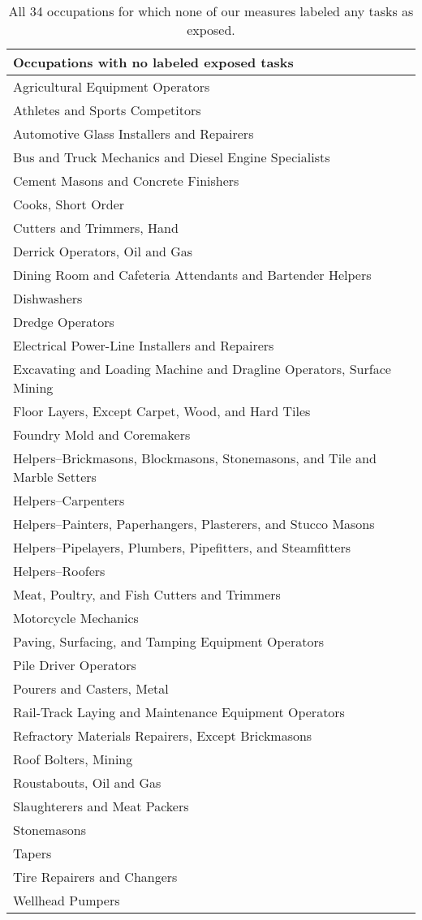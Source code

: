 \begin{table}[H]
\centering
\begin{tabular}{@{}l@{}}
\toprule
\textbf{Occupations with no labeled exposed tasks} \\
\midrule
Agricultural Equipment Operators \\
Athletes and Sports Competitors \\
Automotive Glass Installers and Repairers \\
Bus and Truck Mechanics and Diesel Engine Specialists \\
Cement Masons and Concrete Finishers \\
Cooks, Short Order \\
Cutters and Trimmers, Hand \\
Derrick Operators, Oil and Gas \\
Dining Room and Cafeteria Attendants and Bartender Helpers \\
Dishwashers \\
Dredge Operators \\
Electrical Power-Line Installers and Repairers \\
Excavating and Loading Machine and Dragline Operators, Surface Mining \\
Floor Layers, Except Carpet, Wood, and Hard Tiles \\
Foundry Mold and Coremakers \\
Helpers--Brickmasons, Blockmasons, Stonemasons, and Tile and Marble Setters \\
Helpers--Carpenters \\
Helpers--Painters, Paperhangers, Plasterers, and Stucco Masons \\
Helpers--Pipelayers, Plumbers, Pipefitters, and Steamfitters \\
Helpers--Roofers \\
Meat, Poultry, and Fish Cutters and Trimmers \\
Motorcycle Mechanics \\
Paving, Surfacing, and Tamping Equipment Operators \\
Pile Driver Operators \\
Pourers and Casters, Metal \\
Rail-Track Laying and Maintenance Equipment Operators \\
Refractory Materials Repairers, Except Brickmasons \\
Roof Bolters, Mining \\
Roustabouts, Oil and Gas \\
Slaughterers and Meat Packers \\
Stonemasons \\
Tapers \\
Tire Repairers and Changers \\
Wellhead Pumpers \\
\bottomrule
\end{tabular}
\caption{All 34 occupations for which none of our measures labeled any tasks as exposed.}
\label{table:top_jobs}
\end{table}
